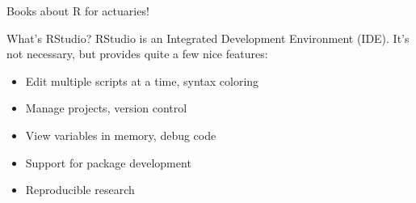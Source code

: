 \documentclass[xcolor=dvipsnames]{beamer}
\begin{document}
\begin{frame}{Books about R for actuaries!}
  \begin{figure}%
      \centering
      \qquad
      \qquad
      \label{fig:example}%
  \end{figure}
\end{frame}

\begin{frame}{What's RStudio?}
RStudio is an Integrated Development Environment (IDE). It's not necessary, but provides quite a few nice features:
  \begin{itemize}
    \item Edit multiple scripts at a time, syntax coloring
    \item Manage projects, version control
    \item View variables in memory, debug code
    \item Support for package development
    \item Reproducible research
  \end{itemize}
\end{frame}
\end{document}
